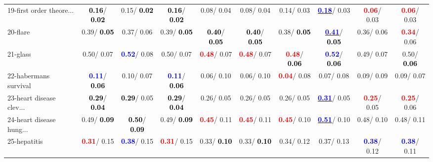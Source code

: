 \begin{table}[h]
\begin{center}
{\begin{tabular}{lc|c|c|c|c|c|c|c|c}
19-first order theore... & \textcolor{black}{\textbf{  0.16}}/\textcolor{black}{\textbf{  0.02}} &   0.15/\textcolor{black}{\textbf{  0.02}} & \textcolor{black}{\textbf{  0.16}}/\textcolor{black}{\textbf{  0.02}} &   0.08/  0.04 &   0.08/  0.04 &   0.14/  0.03 & \underline{\textcolor{blue}{\textbf{  0.18}}}/  0.03 & \textcolor{red}{\textbf{  0.06}}/  0.03 & \textcolor{red}{\textbf{  0.06}}/  0.03 \\
20-flare &   0.39/\textcolor{black}{\textbf{  0.05}} &   0.37/  0.06 &   0.39/\textcolor{black}{\textbf{  0.05}} & \textcolor{black}{\textbf{  0.40}}/\textcolor{black}{\textbf{  0.05}} & \textcolor{black}{\textbf{  0.40}}/\textcolor{black}{\textbf{  0.05}} &   0.38/\textcolor{black}{\textbf{  0.05}} & \underline{\textcolor{blue}{\textbf{  0.41}}}/\textcolor{black}{\textbf{  0.05}} &   0.36/  0.06 & \textcolor{red}{\textbf{  0.34}}/  0.06 \\
21-glass &   0.50/  0.07 & \textcolor{blue}{\textbf{  0.52}}/  0.08 &   0.50/  0.07 & \textcolor{red}{\textbf{  0.48}}/  0.07 & \textcolor{red}{\textbf{  0.48}}/  0.07 & \textcolor{red}{\textbf{  0.48}}/\textcolor{black}{\textbf{  0.06}} & \textcolor{blue}{\textbf{  0.52}}/\textcolor{black}{\textbf{  0.06}} &   0.49/  0.07 &   0.50/\textcolor{black}{\textbf{  0.06}} \\ \hline
22-habermans survival & \textcolor{blue}{\textbf{  0.11}}/\textcolor{black}{\textbf{  0.06}} &   0.10/  0.07 & \textcolor{blue}{\textbf{  0.11}}/\textcolor{black}{\textbf{  0.06}} &   0.06/  0.10 &   0.06/  0.10 & \textcolor{red}{\textbf{  0.04}}/  0.08 &   0.07/  0.08 &   0.09/  0.09 &   0.09/  0.07 \\
23-heart disease clev... & \textcolor{black}{\textbf{  0.29}}/\textcolor{black}{\textbf{  0.04}} & \textcolor{black}{\textbf{  0.29}}/  0.05 & \textcolor{black}{\textbf{  0.29}}/\textcolor{black}{\textbf{  0.04}} &   0.26/  0.05 &   0.26/  0.05 &   0.26/  0.05 & \underline{\textcolor{blue}{\textbf{  0.31}}}/  0.05 & \textcolor{red}{\textbf{  0.25}}/  0.05 & \textcolor{red}{\textbf{  0.25}}/  0.06 \\
24-heart disease hung... &   0.49/\textcolor{black}{\textbf{  0.09}} & \textcolor{black}{\textbf{  0.50}}/\textcolor{black}{\textbf{  0.09}} &   0.49/\textcolor{black}{\textbf{  0.09}} & \textcolor{red}{\textbf{  0.45}}/  0.11 & \textcolor{red}{\textbf{  0.45}}/  0.11 & \textcolor{red}{\textbf{  0.45}}/  0.10 & \underline{\textcolor{blue}{\textbf{  0.51}}}/  0.10 &   0.48/  0.10 &   0.48/  0.11 \\
25-hepatitis & \textcolor{red}{\textbf{  0.31}}/  0.15 & \textcolor{blue}{\textbf{  0.38}}/  0.15 & \textcolor{red}{\textbf{  0.31}}/  0.15 &   0.33/\textcolor{black}{\textbf{  0.10}} &   0.33/\textcolor{black}{\textbf{  0.10}} &   0.34/  0.12 &   0.37/  0.13 & \textcolor{blue}{\textbf{  0.38}}/  0.12 & \textcolor{blue}{\textbf{  0.38}}/  0.11 \\

\end{tabular}}
\end{center}
\end{table}
